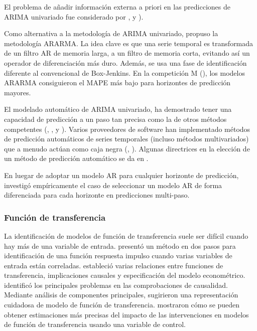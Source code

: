 \documentclass{llncs}
\begin{document}
El problema de añadir información externa a priori en las predicciones de ARIMA univariado fue considerado por  \cite{Cholette1982375}, \cite{Guerrero1991339} y \cite{deAlba199395}).

Como alternativa a la metodología de ARIMA univariado, \cite{Parzen198267} propuso la metodología ARARMA. La idea clave es que una serie temporal es transformada de un filtro AR de memoria larga, a un filtro de memoria corta, evitando así un operador de diferenciación más duro. Además, se usa una fase de identificación diferente al convencional de Box-Jenkins. En la competición M (\cite{Makridakis1982111}), los modelos ARARMA consiguieron el MAPE más bajo para horizontes de predicción mayores. 

El modelado automático de ARIMA univariado, ha demostrado tener una capacidad de predicción a un paso tan precisa como la de otros métodos competentes (\cite{Hill1984319}, \cite{Libert1984325}, \cite{Poulos1987261} y \cite{Texter1989209}). Varios proveedores de software han implementado métodos de predicción automáticos de series temporales (incluso métodos multivariados) que a menudo actúan como caja negra (\cite{Geriner1991127}, \cite{Tashman2000437}). Algunas directrices en la elección de un método de predicción automático se da en \cite{Chatfield198819}.

En luegar de adoptar un modelo AR para cualquier horizonte de predicción, \cite{Kang2003387} investigó empíricamente el caso de seleccionar un modelo AR de forma diferenciada para cada horizonte en predicciones multi-paso.

\subsubsection{Función de transferencia}
La identificación de modelos de función de transferencia suele ser difícil cuando hay más de una variable de entrada. \cite{Edlund1984297} presentó un método en dos pasos para identificación de una función respuesta impulso cuando varias variables de entrada están correladas. \cite{Koreisha1983151} estableció varias relaciones entre funciones de transferencia, implicaciones causales y especificación del modelo econométrico. \cite{Gupta1987195} identificó los principales problemas en las comprobaciones de causalidad. Mediante análisis de componentes principales, \cite{DelMoral1997237} sugirieron una representación cuidadosa de modelo de función de transferencia. \cite{Krishnamurthi198921} mostraron cómo se pueden obtener estimaciones más precisas del impacto de las intervenciones en modelos de función de transferencia usando una variable de control.
\end{document}
